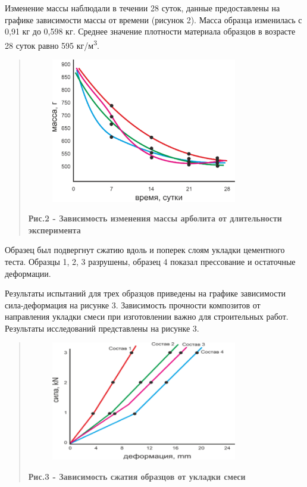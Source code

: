 Изменение массы наблюдали в течении 28 суток, данные предоставлены на
графике зависимости массы от времени (рисунок 2). Масса образца
изменилась с 0,91 кг до 0,598 кг. Среднее значение плотности материала
образцов в возрасте 28 суток равно 595 кг/м\textsuperscript{3}.

\begin{quote}

\begin{figure}[H]
	\centering
	\includegraphics[width=0.8\textwidth]{media/chem2/image3}
	\caption*{}
\end{figure}


{\bfseries Рис.2 - Зависимость изменения массы арболита от длительности
эксперимента}
\end{quote}

Образец был подвергнут сжатию вдоль и поперек слоям укладки цементного
теста. Образцы 1, 2, 3 разрушены, образец 4 показал прессование и
остаточные деформации.

Результаты испытаний для трех образцов приведены на графике зависимости
сила-деформация на рисунке 3. Зависимость прочности композитов от
направления укладки смеси при изготовлении важно для строительных работ.
Результаты исследований представлены на рисунке 3.

\begin{quote}

\begin{figure}[H]
	\centering
	\includegraphics[width=0.8\textwidth]{media/chem2/image4}
	\caption*{}
\end{figure}


{\bfseries Рис.3 - Зависимость сжатия образцов от укладки смеси}
\end{quote}


